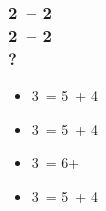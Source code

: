 \documentclass[12pt, a4paper]{article}
\begin{document}

\subsubsection*{2\clubs\ -- 2\diams \\ 
                2\spades\ -- 2\ntx \\
                ?}
\begin{itemize}
    \item 3\clubs\ = 5\spades\ + 4\diams
    \item 3\diams\ = 5\spades\ + 4\hearts
    \item 3\hearts\ = 6+\spades
    \item 3\spades\ = 5\spades\ + 4\clubs
\end{itemize}

\end{document}
